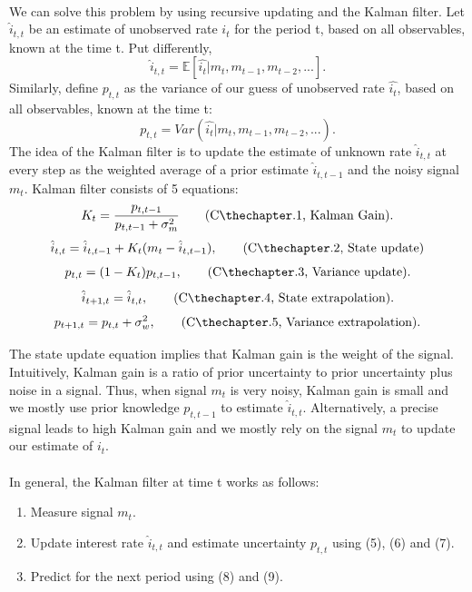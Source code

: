 \documentclass[12pt]{article}
\newcommand{\owntag}[1]{\stepcounter{equation}\tag{\theequation, #1}}
\begin{document}
\paragraph{}
We can solve this problem by using recursive updating and the Kalman filter. Let $\hat{i}_{t,t}$ be an estimate of unobserved rate $i_t$ for the period t, based on all observables, known at the time t. Put differently, 
\begin{equation}
\hat{i}_{t,t} = \mathbb{E}[\hat{i_t}|m_t, m_{t-1}, m_{t-2},...].
\end{equation}
Similarly, define $p_{t,t}$ as the variance of our guess of unobserved rate $\hat{i_t}$, based on all observables, known at the time t:
\begin{equation}
p_{t,t} = Var(\hat{i_t}|m_t, m_{t-1}, m_{t-2},...).
\end{equation}
The idea of the Kalman filter is to update the estimate of unknown rate $\hat{i}_{t,t}$ at every step as the weighted average of a prior estimate $\hat{i}_{t,t-1}$ and the noisy signal $m_t$. Kalman filter consists of 5 equations:
\begin{align}
K_t = \frac{p_{t,t-1}}{p_{t,t-1}+\sigma^2_{m}} \owntag {Kalman Gain}.
\end{align}
\begin{align}
\hat{i}_{t,t} = \hat{i}_{t,t-1} + K_t (m_t - \hat{i}_{t,t-1}), \owntag {State update}
\end{align}
\begin{align}
p_{t,t} = (1-K_t)p_{t,t-1}, \owntag {Variance update}.
\end{align}
\begin{align}
\hat{i}_{t+1,t} = \hat{i}_{t,t}, \owntag {State extrapolation}.
\end{align}
\begin{align}
p_{t+1,t} = p_{t,t} + \sigma^2_w, \owntag {Variance extrapolation}.
\end{align}

The state update equation implies that Kalman gain is the weight of the signal. Intuitively, Kalman gain is a ratio of prior uncertainty to prior uncertainty plus noise in a signal. Thus, when signal $m_t$ is very noisy, Kalman gain is small and we mostly use prior knowledge $p_{t,t-1}$ to estimate $\hat{i}_{t,t}$. Alternatively, a precise signal leads to high Kalman gain and we mostly rely on the signal $m_t$ to update our estimate of $i_t$. 
\paragraph{}
In general, the Kalman filter at time t works as follows:
\begin{enumerate}
    \item {Measure signal $m_t$.}
    \item {Update interest rate $\hat{i}_{t,t}$ and estimate uncertainty $p_{t,t}$ using (5), (6) and (7).}
    \item {Predict for the next period using (8) and (9).}
\end{enumerate}
\end{document}
